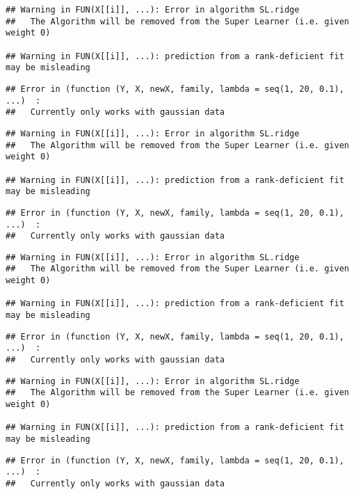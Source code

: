 \documentclass[
]{article}
\begin{document}
\begin{verbatim}
## Warning in FUN(X[[i]], ...): Error in algorithm SL.ridge 
##   The Algorithm will be removed from the Super Learner (i.e. given weight 0)

## Warning in FUN(X[[i]], ...): prediction from a rank-deficient fit may be misleading
\end{verbatim}

\begin{verbatim}
## Error in (function (Y, X, newX, family, lambda = seq(1, 20, 0.1), ...)  : 
##   Currently only works with gaussian data
\end{verbatim}

\begin{verbatim}
## Warning in FUN(X[[i]], ...): Error in algorithm SL.ridge 
##   The Algorithm will be removed from the Super Learner (i.e. given weight 0)

## Warning in FUN(X[[i]], ...): prediction from a rank-deficient fit may be misleading
\end{verbatim}

\begin{verbatim}
## Error in (function (Y, X, newX, family, lambda = seq(1, 20, 0.1), ...)  : 
##   Currently only works with gaussian data
\end{verbatim}

\begin{verbatim}
## Warning in FUN(X[[i]], ...): Error in algorithm SL.ridge 
##   The Algorithm will be removed from the Super Learner (i.e. given weight 0)

## Warning in FUN(X[[i]], ...): prediction from a rank-deficient fit may be misleading
\end{verbatim}

\begin{verbatim}
## Error in (function (Y, X, newX, family, lambda = seq(1, 20, 0.1), ...)  : 
##   Currently only works with gaussian data
\end{verbatim}

\begin{verbatim}
## Warning in FUN(X[[i]], ...): Error in algorithm SL.ridge 
##   The Algorithm will be removed from the Super Learner (i.e. given weight 0)

## Warning in FUN(X[[i]], ...): prediction from a rank-deficient fit may be misleading
\end{verbatim}

\begin{verbatim}
## Error in (function (Y, X, newX, family, lambda = seq(1, 20, 0.1), ...)  : 
##   Currently only works with gaussian data
\end{verbatim}
\end{document}
